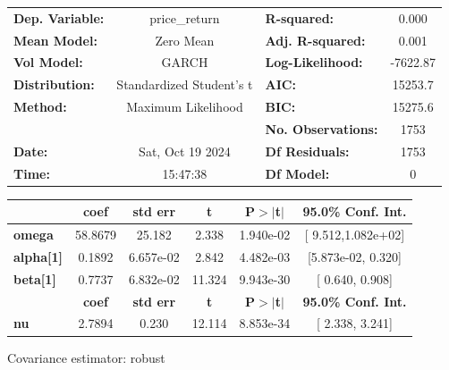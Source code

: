 \documentclass[
  number,
  preprint,
  3p,
  onecolumn]{elsarticle}
\begin{document}
\begin{center}
\begin{tabular}{lclc}
\toprule
\textbf{Dep. Variable:} &      price\_return       & \textbf{  R-squared:         } &     0.000   \\
\textbf{Mean Model:}    &        Zero Mean         & \textbf{  Adj. R-squared:    } &     0.001   \\
\textbf{Vol Model:}     &          GARCH           & \textbf{  Log-Likelihood:    } &   -7622.87  \\
\textbf{Distribution:}  & Standardized Student's t & \textbf{  AIC:               } &    15253.7  \\
\textbf{Method:}        &    Maximum Likelihood    & \textbf{  BIC:               } &    15275.6  \\
\textbf{}               &                          & \textbf{  No. Observations:  } &    1753     \\
\textbf{Date:}          &     Sat, Oct 19 2024     & \textbf{  Df Residuals:      } &    1753     \\
\textbf{Time:}          &         15:47:38         & \textbf{  Df Model:          } &     0       \\
\bottomrule
\end{tabular}
\begin{tabular}{lccccc}
                  & \textbf{coef} & \textbf{std err} & \textbf{t} & \textbf{P$> |$t$|$} & \textbf{95.0\% Conf. Int.}  \\
\midrule
\textbf{omega}    &      58.8679  &       25.182     &     2.338  &      1.940e-02       &    [  9.512,1.082e+02]      \\
\textbf{alpha[1]} &       0.1892  &    6.657e-02     &     2.842  &      4.482e-03       &    [5.873e-02,  0.320]      \\
\textbf{beta[1]}  &       0.7737  &    6.832e-02     &    11.324  &      9.943e-30       &     [  0.640,  0.908]       \\
            & \textbf{coef} & \textbf{std err} & \textbf{t} & \textbf{P$> |$t$|$} & \textbf{95.0\% Conf. Int.}  \\
\midrule
\textbf{nu} &       2.7894  &        0.230     &    12.114  &      8.853e-34       &     [  2.338,  3.241]       \\
\bottomrule
\end{tabular}
\end{center}

Covariance estimator: robust
\end{document}
